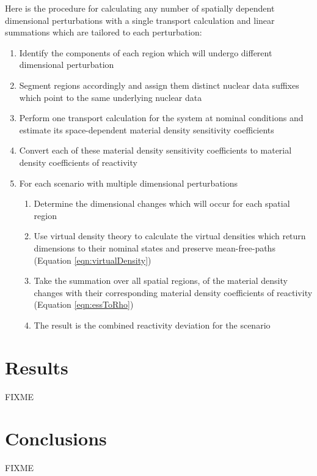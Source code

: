 \documentclass[10pt]{article}
\begin{document}
Here is the procedure for calculating any number of spatially dependent dimensional perturbations with a single transport calculation and linear summations which are tailored to each perturbation:
\begin{enumerate}
    \item Identify the components of each region which will undergo different dimensional perturbation
    \item Segment regions accordingly and assign them distinct nuclear data suffixes which point to the same underlying nuclear data
    \item Perform one transport calculation for the system at nominal conditions and estimate its space-dependent material density sensitivity coefficients
    \item Convert each of these material density sensitivity coefficients to material density coefficients of reactivity
    \item For each scenario with multiple dimensional perturbations
    \begin{enumerate}
        \item Determine the dimensional changes which will occur for each spatial region
        \item Use virtual density theory to calculate the virtual densities which return dimensions to their nominal states and preserve mean-free-paths (Equation \ref{eqn:virtualDensity})
        \item Take the summation over all spatial regions, of the material density changes with their corresponding material density coefficients of reactivity (Equation \ref{eqn:essToRho})
        \item The result is the combined reactivity deviation for the scenario
    \end{enumerate}
\end{enumerate}

\section{ Results }

FIXME

\section{ Conclusions }

FIXME


\end{document}
